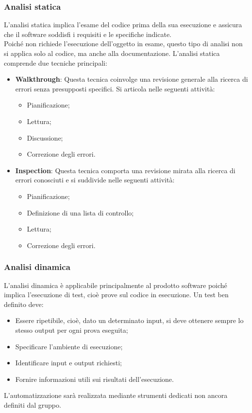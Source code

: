 \subsubsection{Analisi statica}
L'analisi statica implica l'esame del codice prima della sua esecuzione e assicura che il software soddisfi i requisiti
e le specifiche indicate. \\
Poiché non richiede l'esecuzione dell'oggetto in esame, questo tipo di analisi non si applica solo al codice, ma anche alla documentazione.
L'analisi statica comprende due tecniche principali:
\begin{itemize}
    \item \textbf{Walkthrough}: Questa tecnica coinvolge una revisione generale alla ricerca di errori senza presupposti specifici. Si articola nelle seguenti attività:
    \begin{itemize}
        \item Pianificazione;
        \item Lettura;
        \item Discussione;
        \item Correzione degli errori.
    \end{itemize}
    \item \textbf{Inspection}: Questa tecnica comporta una revisione mirata alla ricerca di errori conosciuti e si suddivide nelle seguenti attività:
    \begin{itemize}
        \item Pianificazione;
        \item Definizione di una lista di controllo;
        \item Lettura;
        \item Correzione degli errori.
    \end{itemize}
\end{itemize}
\subsubsection{Analisi dinamica}
L'analisi dinamica è applicabile principalmente al prodotto software
poiché implica l'esecuzione di test, cioè prove sul codice in esecuzione.
Un test ben definito deve:
\begin{itemize}
    \item Essere ripetibile, cioè, dato un determinato input, si deve ottenere sempre lo stesso output per ogni prova eseguita;
    \item Specificare l'ambiente di esecuzione;
    \item Identificare input e output richiesti;
    \item Fornire informazioni utili sui risultati dell'esecuzione.
\end{itemize}
L'automatizzazione sarà realizzata mediante strumenti dedicati non ancora definiti dal gruppo.
